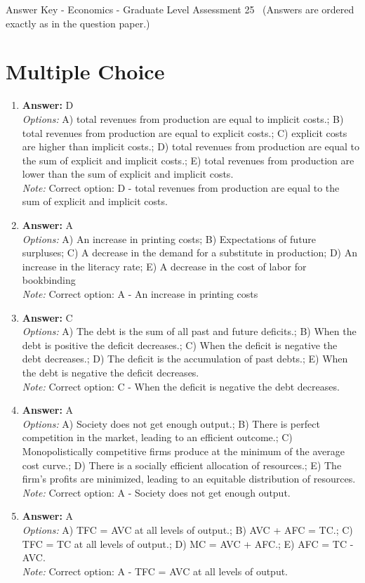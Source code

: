 \documentclass[12pt]{article}
\begin{document}
\begin{center}
Answer Key - Economics - Graduate Level Assessment 25 \
\small (Answers are ordered exactly as in the question paper.)
\end{center}

\section*{Multiple Choice}
\begin{enumerate}[label=\arabic*.]
\item \textbf{Answer:} D
\\ \textit{Options:} A) total revenues from production are equal to implicit costs.; B) total revenues from production are equal to explicit costs.; C) explicit costs are higher than implicit costs.; D) total revenues from production are equal to the sum of explicit and implicit costs.; E) total revenues from production are lower than the sum of explicit and implicit costs.
\\ \textit{Note:} Correct option: D - total revenues from production are equal to the sum of explicit and implicit costs.
\item \textbf{Answer:} A
\\ \textit{Options:} A) An increase in printing costs; B) Expectations of future surpluses; C) A decrease in the demand for a substitute in production; D) An increase in the literacy rate; E) A decrease in the cost of labor for bookbinding
\\ \textit{Note:} Correct option: A - An increase in printing costs
\item \textbf{Answer:} C
\\ \textit{Options:} A) The debt is the sum of all past and future deficits.; B) When the debt is positive the deficit decreases.; C) When the deficit is negative the debt decreases.; D) The deficit is the accumulation of past debts.; E) When the debt is negative the deficit decreases.
\\ \textit{Note:} Correct option: C - When the deficit is negative the debt decreases.
\item \textbf{Answer:} A
\\ \textit{Options:} A) Society does not get enough output.; B) There is perfect competition in the market, leading to an efficient outcome.; C) Monopolistically competitive firms produce at the minimum of the average cost curve.; D) There is a socially efficient allocation of resources.; E) The firm's profits are minimized, leading to an equitable distribution of resources.
\\ \textit{Note:} Correct option: A - Society does not get enough output.
\item \textbf{Answer:} A
\\ \textit{Options:} A) TFC = AVC at all levels of output.; B) AVC + AFC = TC.; C) TFC = TC at all levels of output.; D) MC = AVC + AFC.; E) AFC = TC - AVC.
\\ \textit{Note:} Correct option: A - TFC = AVC at all levels of output.
\end{enumerate}
\end{document}

